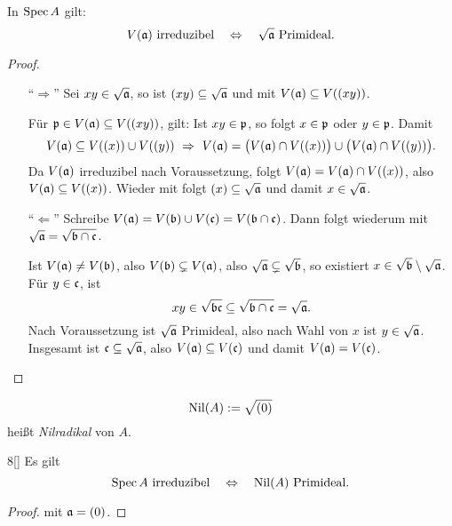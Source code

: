 \begin{lemma}
	\label{lemma:v irreduzibel <=> radikal prim}
	In $\operatorname{Spec} A$ gilt:
	\[
		V(\mathfrak{a}) \text{ irreduzibel} \quad\Leftrightarrow\quad
		\sqrt{\mathfrak{a}} \text{ Primideal}.
	\]
\end{lemma}
\begin{proof}
	\begin{itemize}
	  \item["`$\Rightarrow$"']
	  	Sei $xy \in \sqrt{\mathfrak{a}}$, so ist $(xy) \subseteq \sqrt{\mathfrak{a}}$ und mit
	  	 $V(\mathfrak{a}) \subseteq V((xy))$.
	  	
	  	Für $\mathfrak{p}\in V(\mathfrak{a}) \subseteq V((xy))$, gilt:
	  	Ist $xy \in \mathfrak{p}$, so folgt $x \in \mathfrak{p}$ oder $y\in \mathfrak{p}$. Damit
	  	\[
	  		V(\a) \subseteq V((x)) \cup V((y))
	  		\ \Rightarrow\ 
	  		V(\a) = \big(V(\a) \cap V((x))\big) \cup 
	  				\big(V(\a) \cap V((y))\big).
	  	\]
	  	Da $V(\mathfrak{a})$ irreduzibel nach Voraussetzung, folgt
	  	\obda $V(\mathfrak{a}) = V(\mathfrak{a}) \cap V((x))$, also $V(\mathfrak{a}) \subseteq V((x))$.
	  	Wieder mit \thref{satz:v und radikal} folgt
	  	$(x) \subseteq \sqrt{\mathfrak{a}}$ und damit $x \in \sqrt{\mathfrak{a}}$. 
	 \item["`$\Leftarrow$"']
	 	Schreibe $V(\mathfrak{a}) = V(\mathfrak{b}) \cup V(\mathfrak c) = V(\mathfrak{b}\cap \mathfrak c)$.
	 	Dann folgt wiederum mit 
	 	$\sqrt{\mathfrak{a}} = \sqrt{\mathfrak{b} \cap \mathfrak c}$.
	 	
	 	Ist $V(\mathfrak{a}) \neq V(\mathfrak{b})$, also $V(\mathfrak{b}) \subsetneq V(\mathfrak{a})$, also
	 	$\sqrt{\mathfrak{a}} \subsetneq \sqrt{\mathfrak{b}}$, so existiert 
	 	$x\in \sqrt{\mathfrak{b}} \setminus \sqrt{\mathfrak{a}}$. Für $y \in \mathfrak c$, ist 
	 	\[
	 		xy \in \sqrt{\mathfrak{b}\mathfrak c} \subseteq \sqrt{\mathfrak{b} \cap \mathfrak c} = \sqrt{\mathfrak{a}}.
	 	\]
	 	Nach Voraussetzung ist $\sqrt{\mathfrak{a}}$ Primideal, also 
	 	nach Wahl von $x$ ist $y\in \sqrt{\mathfrak{a}}$.
	 	Insgesamt ist $\mathfrak c \subseteq \sqrt{\mathfrak{a}}$, also
	 	$V(\mathfrak{a}) \subseteq V(\mathfrak c)$	und damit $V(\mathfrak{a}) = V(\mathfrak c)$.
	\end{itemize}
\end{proof}

\begin{definition}[Nilradikal]
	\[
		\operatorname{Nil}(A) := \sqrt{(0)}
	\]
	heißt \emph{Nilradikal} von $A$.
\end{definition}

\begin{korollar}8[]
	Es gilt
	\[
		\operatorname{Spec} A \text{ irreduzibel}
		\quad\Leftrightarrow\quad
		\operatorname{Nil}(A) \text{ Primideal}.
	\]
\end{korollar}
\begin{proof}
	 mit $\mathfrak{a} = (0)$.
\end{proof}

